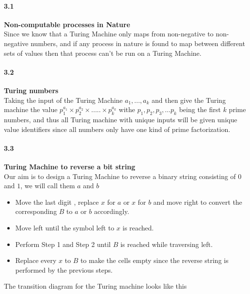 \paragraph{3.1} \textbf{Non-computable processes in Nature}%
\\

Since we know that a Turing Machine only maps from non-negative to non-negative numbers, and if any process in nature is found to map between different sets of values then that process can't be run on a Turing Machine.


\paragraph{3.2} \textbf{Turing numbers }
\\
Taking the input of the Turing Machine $a_1,...,a_k$ and then give the Turing machine the value $p_1^{a_1} \times p_2^{a_2} \times ..... \times p_k^{a_k}$ withe $p_1, p_2, p_3,...p_k$ being the first $k$ prime numbers, and thus all Turing machine with unique inputs will be given unique value identifiers since all numbers only have one kind of prime factorization.

\paragraph{3.3} \textbf{Turing Machine to reverse a bit string}
\\
Our aim is to design a Turing Machine to reverse a binary string consisting of $0$ and $1$, we will call them $a$ and $b$

\begin{itemize}
    \item Move the last digit , replace $x$ for $a$ or $x$ for $b$ and move right to convert the corresponding $B$ to $a$ or $b$ accordingly.

    \item Move left until the symbol left to $x$ is reached.

    \item Perform Step 1 and Step 2 until $B$ is reached while traversing left.

    \item Replace every $x$ to $B$ to make the cells empty since the reverse string is performed by the previous steps.
\end{itemize}

The transition diagram for the Turing machine looks like this

